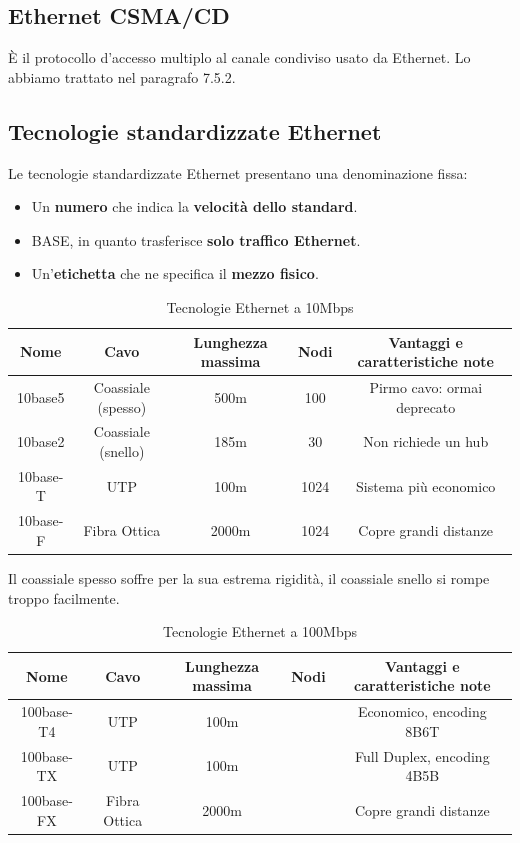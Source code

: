 \subsection{Ethernet CSMA/CD}
È il protocollo d'accesso multiplo al canale condiviso usato da Ethernet. Lo abbiamo trattato nel paragrafo 7.5.2.

\subsection{Tecnologie standardizzate Ethernet}
Le tecnologie standardizzate Ethernet presentano una denominazione fissa:
\begin{itemize}
	\item Un \textbf{numero} che indica la \textbf{velocità dello standard}.
	\item BASE, in quanto trasferisce \textbf{solo traffico Ethernet}.
	\item Un'\textbf{etichetta} che ne specifica il \textbf{mezzo fisico}.
\end{itemize}
\begin{table}[htp]
	\centering
	\begin{tabular}{|c|c|c|c|c|}
		\hline
		Nome & Cavo & Lunghezza massima & Nodi & Vantaggi e caratteristiche note\\
		\hline
		10base5 & Coassiale (spesso) & 500m & 100 & Pirmo cavo: ormai deprecato\\
		\hline
		10base2 & Coassiale (snello)& 185m & 30 & Non richiede un hub\\
		\hline
		10base-T & UTP & 100m & 1024 & Sistema più economico\\
		\hline
		10base-F & Fibra Ottica & 2000m & 1024 & Copre grandi distanze\\
		\hline
	\end{tabular}
	\caption{Tecnologie Ethernet a 10Mbps}
\end{table}

Il coassiale spesso soffre per la sua estrema rigidità, il coassiale snello si rompe troppo facilmente.

\begin{table}[htp]
	\centering
	\begin{tabular}{|c|c|c|c|c|}
		\hline
		Nome & Cavo & Lunghezza massima & Nodi & Vantaggi e caratteristiche note\\
		\hline
		100base-T4 & UTP & 100m &  & Economico, encoding 8B6T\\
		\hline
		100base-TX & UTP & 100m &  & Full Duplex, encoding 4B5B\\
		\hline
		100base-FX & Fibra Ottica & 2000m &  & Copre grandi distanze\\
		\hline
	\end{tabular}
	\caption{Tecnologie Ethernet a 100Mbps}
\end{table}

